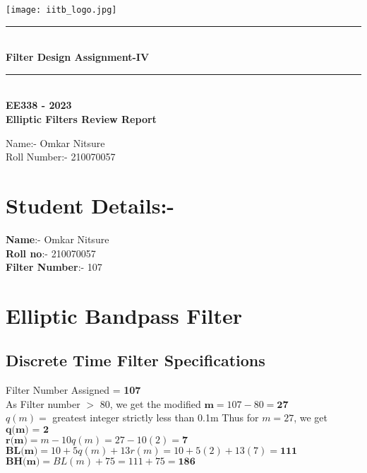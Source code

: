 \documentclass[12pt]{article}
\begin{document}
\begin{titlepage}
\begin{center}
    \vspace*{\fill}
\texttt{[image: iitb\_logo.jpg]}\\
[4 cm]
    \rule{12.5cm}{0.75mm}\\
    \huge{\bfseries Filter Design Assignment-IV}
    \rule{12.5cm}{0.75mm}\\
    [0.5cm]
   {\textbf {EE338 - 2023 \\
    Elliptic Filters Review Report}}\\
    [2.5cm]
\end{center}
\begin{flushleft}
   {\huge
    Name:- Omkar Nitsure \\
    Roll Number:- 210070057 \\}
    \end{flushleft}
\end{titlepage}
\tableofcontents


\pagestyle{fancy}

\fancyhead{}
\fancyfoot{}
\fancyfoot[C]{\thepage}
\newpage
\section{Student Details:-}
\textbf{Name}:- Omkar Nitsure\\
\textbf{Roll no}:- 210070057\\
\textbf{Filter Number}:- 107\\


\section{Elliptic Bandpass Filter}

\subsection{Discrete Time Filter Specifications}

Filter Number Assigned = \textbf{107}\\
As Filter number $>$ 80, we get the modified $\textbf{m} = 107 - 80 = \textbf{27}$\\
$q(m) =$ greatest integer strictly less than 0.1m
Thus for $m = 27$, we get $\textbf{q(m) = 2}$\\
$\textbf{r(m)} = m - 10q(m) = 27 - 10(2) = \textbf{7}$\\
$\textbf{BL(m)} = 10 + 5q(m) + 13r(m) = 10 + 5(2) + 13(7) = \textbf{111}$\\
$\textbf{BH(m)} = BL(m) + 75 = 111 + 75 = \textbf{186}$\\
\par
\end{document}
